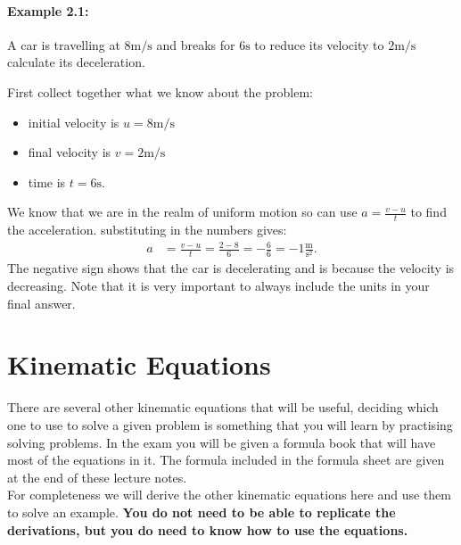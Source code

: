 \documentclass[a4paper,12pt]{book}
\begin{document}
\paragraph{Example 2.1:} A car is travelling at $8\text{m/s}$ and breaks for $6\text{s}$  to reduce its velocity to $2\text{m/s}$ calculate its deceleration.

First collect together what we know about the problem:
\begin{itemize}
\setlength{\itemsep}{-5pt}
    \item initial velocity is $u=8\text{m/s}$
    \item final velocity is $v=2\text{m/s}$
    \item time is $t=6\text{s}$.
\end{itemize}
We know that we are in the realm of uniform motion so can use $a=\frac{v-u}{t}$ to find the acceleration. substituting in the numbers gives:
\begin{align*}
    a&=\frac{v-u}{t}=\frac{2-8}{6}=-\frac{6}{6}=-1\frac{\text{m}}{\text{s}^{2}}.
\end{align*}
The negative sign shows that the car is decelerating and is because the velocity is decreasing. Note that it is very important to always include the units in your final answer.\\

\vspace{2cm}

\section{Kinematic Equations}
There are several other kinematic equations that will be useful, deciding which one to use to solve a given problem is something that you will learn by practising solving problems. In the exam you will be given a formula book that will have most of the equations in it. The formula included in the formula sheet are given at the end of these lecture notes.\\

For completeness we will derive the other kinematic equations here and use them to solve an example. \textbf{You do not need to be able to replicate the derivations, but you do need to know how to use the equations.}\\
\end{document}
